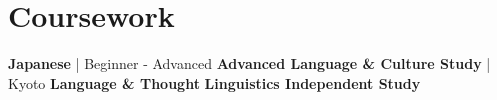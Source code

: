 \documentclass[letterpaper]{deedy-resume_sm} %
\begin{document}
\section{Coursework}
\textbf{Japanese} | Beginner - Advanced \textbullet{}
\textbf{Advanced Language \& Culture Study} | Kyoto \textbullet{} \textbf{Language \& Thought} \textbullet{}\textbf{Linguistics Independent Study}
\end{document}
